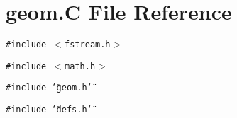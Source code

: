 \section{geom.C File Reference}
\label{geom_C}
{\tt \#include $<$fstream.h$>$}\par
{\tt \#include $<$math.h$>$}\par
{\tt \#include \char`\"{}geom.h\char`\"{}}\par
{\tt \#include \char`\"{}defs.h\char`\"{}}\par
